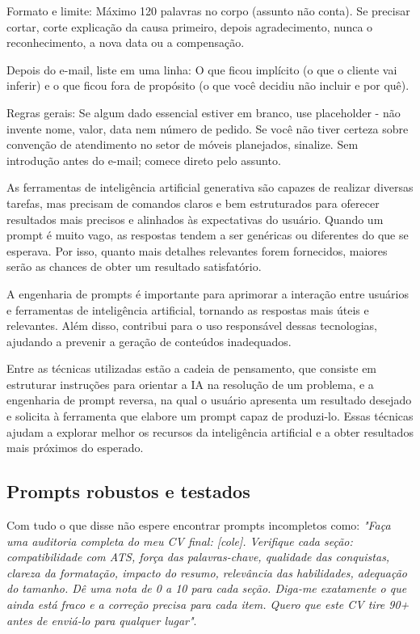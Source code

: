 \documentclass[11pt, a4paper]{article}
\begin{document}
\begin{promptbox}
Formato e limite:
 Máximo 120 palavras no corpo (assunto não conta).
 Se precisar cortar, corte explicação da causa primeiro, depois agradecimento, nunca o reconhecimento, a nova data ou a compensação.
 
Depois do e-mail, liste em uma linha: 
 O que ficou implícito (o que o cliente vai inferir) e o que ficou fora de propósito (o que você decidiu não incluir e por quê).

Regras gerais:
 Se algum dado essencial estiver em branco, use placeholder - não invente nome, valor, data nem número de pedido.
 Se você não tiver certeza sobre convenção de atendimento no setor de móveis planejados, sinalize.
 Sem introdução antes do e-mail; comece direto pelo assunto.
\end{promptbox}

As ferramentas de inteligência artificial generativa são capazes de realizar diversas tarefas, mas precisam de comandos claros e bem estruturados para oferecer resultados mais precisos e alinhados às expectativas do usuário. Quando um prompt é muito vago, as respostas tendem a ser genéricas ou diferentes do que se esperava. Por isso, quanto mais detalhes relevantes forem fornecidos, maiores serão as chances de obter um resultado satisfatório.

A engenharia de prompts é importante para aprimorar a interação entre usuários e ferramentas de inteligência artificial, tornando as respostas mais úteis e relevantes. Além disso, contribui para o uso responsável dessas tecnologias, ajudando a prevenir a geração de conteúdos inadequados.

Entre as técnicas utilizadas estão a cadeia de pensamento, que consiste em estruturar instruções para orientar a IA na resolução de um problema, e a engenharia de prompt reversa, na qual o usuário apresenta um resultado desejado e solicita à ferramenta que elabore um prompt capaz de produzi-lo. Essas técnicas ajudam a explorar melhor os recursos da inteligência artificial e a obter resultados mais próximos do esperado.

\subsection*{Prompts robustos e testados}
Com tudo o que disse não espere encontrar prompts incompletos como: \textit{"Faça uma auditoria completa do meu CV final: [cole]. Verifique cada seção: compatibilidade com ATS, força das palavras-chave, qualidade das conquistas, clareza da formatação, impacto do resumo, relevância das habilidades, adequação do tamanho. Dê uma nota de 0 a 10 para cada seção. Diga-me exatamente o que ainda está fraco e a correção precisa para cada item. Quero que este CV tire 90+ antes de enviá-lo para qualquer lugar"}.
\end{document}
